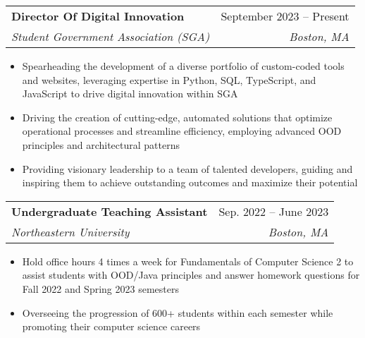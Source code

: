 \documentclass[letterpaper,8pt]{article}
\makeatletter
\newcommand{\resumeItem}[1]{
  \item\small{
    {#1 \vspace{-2pt}}
  }
}
\newcommand{\resumeSubheading}[4]{
  \vspace{-2pt}\item
    \begin{tabular*}{0.97\textwidth}[t]{l@{\extracolsep{\fill}}r}
      \textbf{#1} & #2 \\
      \textit{\small#3} & \textit{\small #4} \\
    \end{tabular*}\vspace{-7pt}
}
\newcommand{\resumeSubSubheading}[2]{
    \item
    \begin{tabular*}{0.97\textwidth}{l@{\extracolsep{\fill}}r}
      \textit{\small#1} & \textit{\small #2} \\
    \end{tabular*}\vspace{-7pt}
}
\newcommand{\resumeSubHeadingListEnd}{\end{itemize}}
\newcommand{\resumeItemListStart}{\begin{itemize}}
\newcommand{\resumeItemListEnd}{\end{itemize}\vspace{-5pt}}
\makeatother
\begin{document}
    \resumeSubheading
      {Director Of Digital Innovation}{September 2023 -- Present}
      {Student Government Association (SGA)}{Boston, MA}
      \resumeItemListStart
        \resumeItem{Spearheading the development of a diverse portfolio of custom-coded tools and websites, leveraging expertise in Python, SQL, TypeScript, and JavaScript to drive digital innovation within SGA}
        \resumeItem{Driving the creation of cutting-edge, automated solutions that optimize operational processes and streamline efficiency, employing advanced OOD principles and architectural patterns}
        \resumeItem{Providing visionary leadership to a team of talented developers, guiding and inspiring them to achieve outstanding outcomes and maximize their potential}
      \resumeItemListEnd

    \resumeSubheading
      {Undergraduate Teaching Assistant}{Sep. 2022 -- June 2023}
      {Northeastern University}{Boston, MA}
      \resumeItemListStart
        \resumeItem{Hold office hours 4 times a week for Fundamentals of Computer Science 2 to assist students with OOD/Java principles and answer homework questions for Fall 2022 and Spring 2023 semesters}
        \resumeItem{Overseeing the progression of 600+ students within each semester while promoting their computer science careers}
    \resumeItemListEnd

      


\end{document}
